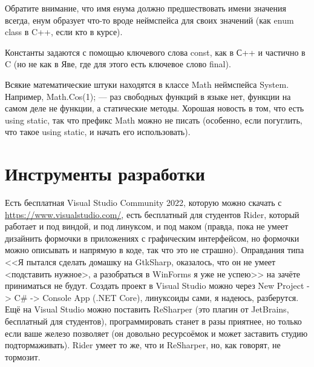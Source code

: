 \documentclass{../../text-style}
\begin{document}
Обратите внимание, что имя енума должно предшествовать имени значения всегда, енум образует что-то вроде неймспейса для своих значений (как enum class в C++, если кто в курсе).

Константы задаются с помощью ключевого слова const, как в С++ и частично в C (но не как в Яве, где для этого есть ключевое слово final).

Всякие математические штуки находятся в классе Math неймспейса System. Например, Math.Cos(1); --- раз свободных функций в языке нет, функции на самом деле не функции, а статические методы. Хорошая новость в том, что есть using static, так что префикс Math можно не писать (особенно, если погуглить, что такое using static, и начать его использовать).

\section{Инструменты разработки}

Есть бесплатная Visual Studio Community 2022, которую можно скачать с \url{https://www.visualstudio.com/}, есть бесплатный для студентов Rider, который работает и под виндой, и под линуксом, и под маком (правда, пока не умеет дизайнить формочки в приложениях с графическим интерфейсом, но формочки можно описывать и напрямую в коде, так что это не страшно). Оправдания типа <<Я пытался сделать домашку на GtkSharp, оказалось, что он не умеет <подставить нужное>, а разобраться в WinForms я уже не успею>> на зачёте приниматься не будут. Создать проект в Visual Studio можно через New Project -> C\# -> Console App (.NET Core), линуксоиды сами, я надеюсь, разберутся. Ещё на Visual Studio можно поставить ReSharper (это плагин от JetBrains, бесплатный для студентов), программировать станет в разы приятнее, но только если ваше железо позволяет (он довольно ресурсоёмок и может заставить студию подтормаживать). Rider умеет то же, что и ReSharper, но, как говорят, не тормозит.
\end{document}
